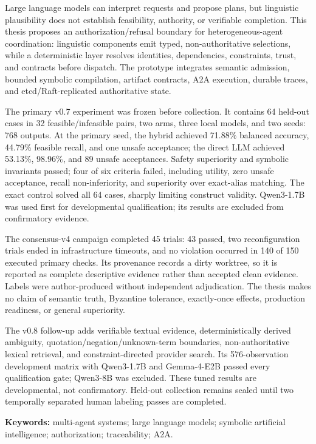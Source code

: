 \begin{abstractEN}

Large language models can interpret requests and propose plans, but linguistic plausibility does not establish feasibility, authority, or verifiable completion. This thesis proposes an authorization/refusal boundary for heterogeneous-agent coordination: linguistic components emit typed, non-authoritative selections, while a deterministic layer resolves identities, dependencies, constraints, trust, and contracts before dispatch. The prototype integrates semantic admission, bounded symbolic compilation, artifact contracts, A2A execution, durable traces, and etcd/Raft-replicated authoritative state.

The primary v0.7 experiment was frozen before collection. It contains 64 held-out cases in 32 feasible/infeasible pairs, two arms, three local models, and two seeds: 768 outputs. At the primary seed, the hybrid achieved 71.88\% balanced accuracy, 44.79\% feasible recall, and one unsafe acceptance; the direct LLM achieved 53.13\%, 98.96\%, and 89 unsafe acceptances. Safety superiority and symbolic invariants passed; four of six criteria failed, including utility, zero unsafe acceptance, recall non-inferiority, and superiority over exact-alias matching. The exact control solved all 64 cases, sharply limiting construct validity. Qwen3-1.7B was used first for developmental qualification; its results are excluded from confirmatory evidence.

The consensus-v4 campaign completed 45 trials: 43 passed, two reconfiguration trials ended in infrastructure timeouts, and no violation occurred in 140 of 150 executed primary checks. Its provenance records a dirty worktree, so it is reported as complete descriptive evidence rather than accepted clean evidence. Labels were author-produced without independent adjudication. The thesis makes no claim of semantic truth, Byzantine tolerance, exactly-once effects, production readiness, or general superiority.

The v0.8 follow-up adds verifiable textual evidence, deterministically derived ambiguity, quotation/negation/unknown-term boundaries, non-authoritative lexical retrieval, and constraint-directed provider search. Its 576-observation development matrix with Qwen3-1.7B and Gemma-4-E2B passed every qualification gate; Qwen3-8B was excluded. These tuned results are developmental, not confirmatory. Held-out collection remains sealed until two temporally separated human labeling passes are completed.

\noindent\textbf{Keywords:} multi-agent systems; large language models; symbolic artificial intelligence; authorization; traceability; A2A.

\end{abstractEN}
